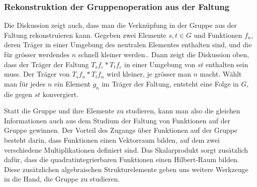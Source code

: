 %
%
\subsubsection{Rekonstruktion der Gruppenoperation aus der Faltung}
Die Diskussion zeigt auch, dass man die Verknüpfung in der Gruppe aus
der Faltung rekonstruieren kann.
Gegeben zwei Elemente $s,t\in G$ und Funktionen $f_n$,
deren Träger in einer Umgebung des neutralen Elementes
enthalten sind, und die für grösser werdendes $n$ schnell kleiner werden..
Dann zeigt die Diskussion oben, dass der Träger der Faltung 
$T_sf_{\varepsilon}*T_tf_{\varepsilon}$ in einer Umgebung von $st$
enthalten sein muss.
Der Träger von $T_sf_n*T_tf_n$ wird kleiner, je grösser man $n$ macht.
Wählt man für jedes $n$ ein Element $g_n$ im Träger der Faltung,
entsteht eine Folge in $G$, die gegen $st$ konvergiert.

Statt die Gruppe und ihre Elemente zu studieren, kann man also die
gleichen Informationen auch aus dem Studium der Faltung von Funktionen
auf der Gruppe gewinnen.
Der Vorteil des Zugangs über Funktionen auf der Gruppe besteht
darin, dass Funktionen einen Vektorraum bilden, auf dem zwei
verschiedene Multiplikationen definiert sind.
Das Skalarprodukt sorgt zusätzlich dafür, dass die quadratintegrierbaren
Funktionen einen Hilbert-Raum bilden.
Diese zusätzlichen algebraischen Strukturelemente geben uns weitere
Werkzeuge in die Hand, die Gruppe zu studieren.







